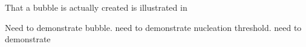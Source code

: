 That a bubble is actually created is illustrated in 

Need to demonstrate bubble.
need to demonstrate nucleation threshold.
need to demonstrate 

%
%








